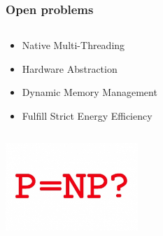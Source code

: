\documentclass{beamer}
\begin{document}
\begin{frame}
	\frametitle{Open problems}
	\begin{columns}[c]
		\begin{column}{30cm}
			\vspace{.1cm}
			\begin{itemize}
				\justifying
				\item Native Multi-Threading
				\item Hardware Abstraction
				\item Dynamic Memory Management
				\item Fulfill Strict Energy Efficiency
			\end{itemize}
		\end{column}
	\end{columns}
	\vspace{.5cm}
	\hspace*{5.5cm} \includegraphics[width=5cm]{figs/open-problems.jpg}
\end{frame}
\end{document}
